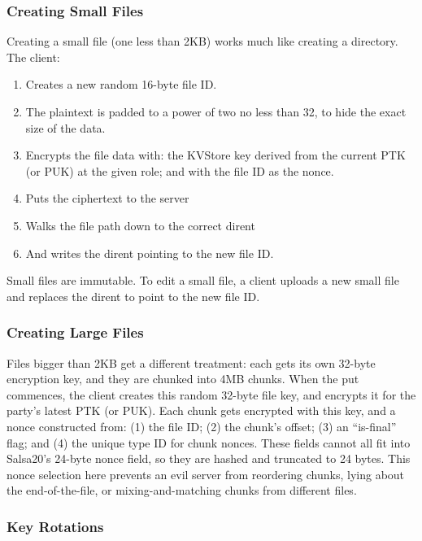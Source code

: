 \subsubsection{Creating Small Files}

Creating a small file (one less than 2KB) works much like creating a directory. The client:
%
\begin{enumerate}
    \item Creates a new random 16-byte file ID. 
    \item The plaintext is padded to a power of two no less than 32, to hide the exact size of the data.
    \item Encrypts the file data with: the KVStore key derived from the 
         current PTK (or PUK) at the given role; and with the file ID as the nonce.
    \item Puts the ciphertext to the server
    \item Walks the file path down to the correct dirent
    \item And writes the dirent pointing to the new file ID.
\end{enumerate}
%
Small files are immutable. To edit a small file, a client uploads a new 
small file and replaces the dirent to point to the new file ID.


\subsubsection{Creating Large Files}

Files bigger than 2KB get a different treatment: each gets its own 32-byte encryption
key, and they are chunked into 4MB chunks. When the put commences, the client
creates this random 32-byte file key, and encrypts it for the party's latest
PTK (or PUK). Each chunk gets encrypted with this key, and a nonce constructed 
from: (1) the file ID; (2) the chunk's offset; (3) an ``is-final'' flag;
and (4) the unique type ID for chunk nonces. These fields cannot all fit into
Salsa20's 24-byte nonce field, so they are hashed and truncated to 24 bytes.
This nonce selection here prevents an evil server from reordering chunks,
lying about the end-of-the-file, or mixing-and-matching chunks from different
files.

\subsubsection{Key Rotations}
\label{sec:kv:rotations}

